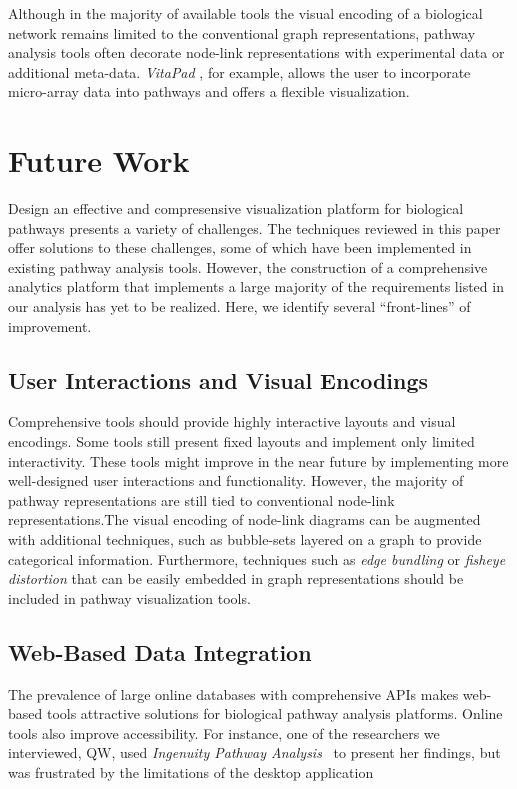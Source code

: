 \documentclass[review,journal]{vgtc}         %
\newcounter{requirement}
\begin{document}
Although in the majority of available tools the visual encoding of a biological network remains limited to the conventional graph representations, pathway analysis tools often decorate node-link representations with experimental data or additional meta-data. \textit{VitaPad} \cite{holford2005vitapad}, for example, allows the user to incorporate micro-array data into pathways and offers a flexible visualization.

\section{Future Work}

Design an effective and compresensive visualization platform for biological pathways presents a variety of challenges. The techniques reviewed in this paper offer solutions to these challenges, some of which have been implemented in existing pathway analysis tools. However, the construction of a comprehensive analytics platform that implements a large majority of the requirements listed in our analysis has yet to be realized. Here, we identify several ``front-lines'' of improvement.

\subsection{User Interactions and Visual Encodings}

Comprehensive tools should provide highly interactive layouts and visual encodings. Some tools still present fixed layouts and implement only limited interactivity. These tools might improve in the near future by implementing more well-designed user interactions and functionality. However, the majority of pathway representations are still tied to conventional node-link representations.The visual encoding of node-link diagrams can be augmented with additional techniques, such as bubble-sets layered on a graph to provide categorical information. Furthermore, techniques such as \textit{edge bundling} or \textit{fisheye distortion} that can be easily embedded in graph representations should be included in pathway visualization tools.

\subsection{Web-Based Data Integration}

The prevalence of large online databases with comprehensive APIs makes web-based tools attractive solutions for biological pathway analysis platforms. Online tools also improve accessibility. For instance, one of the researchers we interviewed, QW, used \emph{Ingenuity Pathway Analysis}~\cite{Kramer2013ipa-causal} to present her findings, but was frustrated by the limitations of the desktop application
\end{document}
